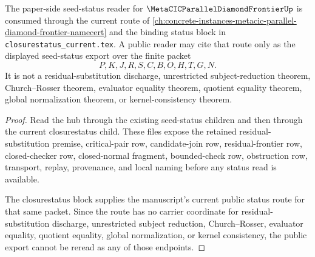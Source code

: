 \begin{theorem}
\label{thm:metacic-parallel-diamond-frontier-seed-status-public-export}
The paper-side seed-status reader for $\MetaCICParallelDiamondFrontierUp$ is consumed through the current route of \autoref{ch:concrete-instances-metacic-parallel-diamond-frontier-namecert} and the binding status block in \texttt{closurestatus\_current.tex}. A public reader may cite that route only as the displayed seed-status export over the finite packet
$$
P,K,J,R,S,C,B,O,H,T,G,N .
$$
It is not a residual-substitution discharge, unrestricted subject-reduction theorem, Church--Rosser theorem, evaluator equality theorem, quotient equality theorem, global normalization theorem, or kernel-consistency theorem.
\end{theorem}
\begin{proof}
Read the hub through the existing seed-status children and then through the current closurestatus child. These files expose the retained residual-substitution premise, critical-pair row, candidate-join row, residual-frontier row, closed-checker row, closed-normal fragment, bounded-check row, obstruction row, transport, replay, provenance, and local naming before any status read is available.

The closurestatus block supplies the manuscript's current public status route for that same packet. Since the route has no carrier coordinate for residual-substitution discharge, unrestricted subject reduction, Church--Rosser, evaluator equality, quotient equality, global normalization, or kernel consistency, the public export cannot be reread as any of those endpoints.
\end{proof}
